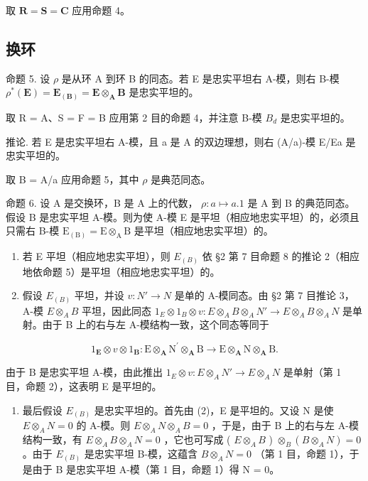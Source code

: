 取 \(\mathbf{R} = \mathbf{S} = \mathbf{C}\) 应用命题 4。

\subsection{换环}

命题 5. 设 \(\rho\) 是从环 A 到环 B 的同态。若 E 是忠实平坦右 A-模，则右 B-模 \(\rho^{*}(\mathbf{E}) = \mathbf{E}_{(\mathbf{B})} = \mathbf{E} \otimes_{\mathbf{A}} \mathbf{B}\) 是忠实平坦的。

取 R = A、S = F = B 应用第 2 目的命题 4，并注意 B-模 \(B_{d}\) 是忠实平坦的。

推论. 若 E 是忠实平坦右 A-模，且 a 是 A 的双边理想，则右 (A/a)-模 E/Ea 是忠实平坦的。

取 B = A/a 应用命题 5，其中 \(\rho\) 是典范同态。

命题 6. 设 A 是交换环，B 是 A 上的代数， \(\rho: a \mapsto a . 1\) 是 A 到 B 的典范同态。假设 B 是忠实平坦 A-模。则为使 A-模 E 是平坦（相应地忠实平坦）的，必须且只需右 B-模 \(\mathrm{E}_{(\mathrm{B})} = \mathrm{E} \otimes_{\mathrm{A}} \mathrm{B}\) 是平坦（相应地忠实平坦）的。

\begin{enumerate}
\def\labelenumi{(\arabic{enumi})}
\item
  若 E 平坦（相应地忠实平坦），则 \(E_{(B)}\) 依 §2 第 7 目命题 8 的推论 2（相应地依命题 5）是平坦（相应地忠实平坦）的。
\item
  假设 \(E_{(B)}\) 平坦，并设 \(v: N' \to N\) 是单的 A-模同态。由 §2 第 7 目推论 3，A-模 \(E \otimes_{A} B\) 平坦，因此同态 \(1_{E} \otimes 1_{B} \otimes v: E \otimes_{A} B \otimes_{A} N' \to E \otimes_{A} B \otimes_{A} N\) 是单射。由于 B 上的右与左 A-模结构一致，这个同态等同于
\end{enumerate}

\[
\mathrm{1} _ {\mathbf {E}} \otimes v \otimes \mathrm{1} _ {\mathbf {B}}: \mathrm{E} \otimes_ {\mathbf {A}} \mathrm{N} ^ {\prime} \otimes_ {\mathbf {A}} \mathrm{B} \rightarrow \mathrm{E} \otimes_ {\mathbf {A}} \mathrm{N} \otimes_ {\mathbf {A}} \mathrm{B}.
\]

由于 B 是忠实平坦 A-模，由此推出 \(1_{E} \otimes v: E \otimes_{A} N' \to E \otimes_{A} N\) 是单射（第 1 目，命题 2），这表明 E 是平坦的。

\begin{enumerate}
\def\labelenumi{(\arabic{enumi})}
\setcounter{enumi}{2}
\tightlist
\item
  最后假设 \(E_{(B)}\) 是忠实平坦的。首先由 (2)，E 是平坦的。又设 N 是使 \(E \otimes_{A} N = 0\) 的 A-模。则 \(E \otimes_{A} N \otimes_{A} B = 0\) ，于是，由于 B 上的右与左 A-模结构一致，有 \(E \otimes_{A} B \otimes_{A} N = 0\) ，它也可写成 ( \(E \otimes_{A} B\) ) \(\otimes_{B} (B \otimes_{A} N) = 0\) 。由于 \(E_{(B)}\) 是忠实平坦 B-模，这蕴含 \(B \otimes_{A} N = 0\) （第 1 目，命题 1），于是由于 B 是忠实平坦 A-模（第 1 目，命题 1）得 N = 0。
\end{enumerate}

